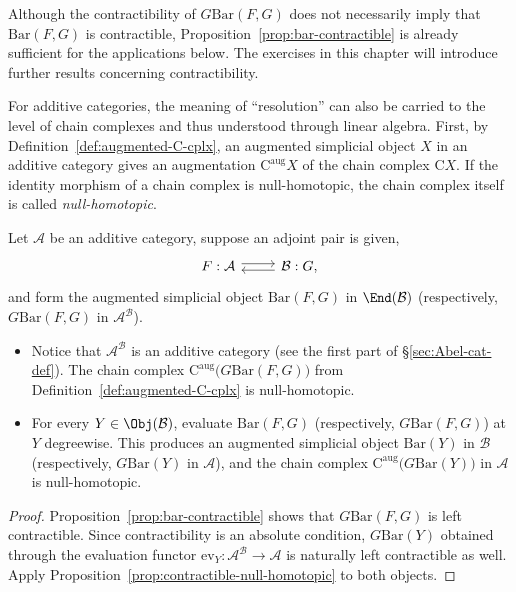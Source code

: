 Although the contractibility of $G\mathrm{Bar}(F,G)$ does not necessarily
imply that $\mathrm{Bar}(F,G)$ is contractible,
Proposition~\ref{prop:bar-contractible} is already sufficient for the
applications below. The exercises in this chapter will introduce further
results concerning contractibility.

For additive categories, the meaning of ``resolution'' can also be carried to
the level of chain complexes and thus understood through linear algebra.
First, by Definition~\ref{def:augmented-C-cplx}, an augmented simplicial
object $X$ in an additive category gives an augmentation
$\mathrm{C}^{\mathrm{aug}}X$ of the chain complex $\mathrm{C}X$. If the
identity morphism of a chain complex is null-homotopic, the chain complex
itself is called \emph{null-homotopic}.

\begin{theorem}\label{prop:bar-null-homotopic}
	Let $\mathcal{A}$ be an additive category, suppose an adjoint pair is given,
	\[\begin{tikzcd}
		F : \mathcal{A} \arrow[shift left, r] & \mathcal{B}: G, \arrow[shift left, l]
	\end{tikzcd}\]
	and form the augmented simplicial object $\mathrm{Bar}(F,G)$ in
	$\End(\mathcal{B})$ (respectively, $G\mathrm{Bar}(F,G)$ in
	$\mathcal{A}^{\mathcal{B}}$).
	\begin{itemize}
		\item Notice that $\mathcal{A}^{\mathcal{B}}$ is an additive category
		(see the first part of \S\ref{sec:Abel-cat-def}). The chain complex
		$\mathrm{C}^{\mathrm{aug}}\bigl(G\mathrm{Bar}(F,G)\bigr)$ from
		Definition~\ref{def:augmented-C-cplx} is null-homotopic.
		\item For every $Y\in\Obj(\mathcal{B})$, evaluate
		$\mathrm{Bar}(F,G)$ (respectively, $G\mathrm{Bar}(F,G)$) at $Y$
		degreewise. This produces an augmented simplicial object
		$\mathrm{Bar}(Y)$ in $\mathcal{B}$ (respectively,
		$G\mathrm{Bar}(Y)$ in $\mathcal{A}$), and the chain complex
		$\mathrm{C}^{\mathrm{aug}}\bigl(G\mathrm{Bar}(Y)\bigr)$ in
		$\mathcal{A}$ is null-homotopic.
	\end{itemize}
\end{theorem}
\begin{proof}
	Proposition~\ref{prop:bar-contractible} shows that
	$G\mathrm{Bar}(F,G)$ is left contractible. Since contractibility is an
	absolute condition, $G\mathrm{Bar}(Y)$ obtained through the evaluation
	functor $\mathrm{ev}_Y:\mathcal{A}^{\mathcal{B}}\to\mathcal{A}$ is
	naturally left contractible as well. Apply
	Proposition~\ref{prop:contractible-null-homotopic} to both objects.
\end{proof}

